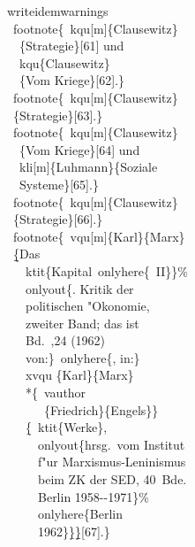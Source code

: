 \documentclass[12pt,a4paper]{article}
\newcommand{\pbs}{\string\ \unskip}
\newcommand{\bs}{\protect\pbs}
\begin{document}
\vspace{1ex}
\Doppelbox
{\bs writeidemwarnings
 \\ \ \bs footnote\{\bs kqu[m]\{Clausewitz\} 
 \\ \ \ \ \{Strategie\}[61] und 
 \\ \ \ \bs kqu\{Clausewitz\}
 \\ \ \ \ \{Vom Kriege\}[62].\} 
 \\[1ex] \ \bs footnote\{\bs kqu[m]\{Clausewitz\} 
 \\ \ \ \{Strategie\}[63].\}
 \\[1ex] \ \bs footnote\{\bs kqu[m]\{Clausewitz\} 
 \\ \ \ \ \{Vom Kriege\}[64] und 
 \\ \ \ \bs kli[m]\{Luhmann\}\{Soziale 
 \\ \ \ \ Systeme\}[65].\}
 \\[1ex] \ \bs footnote\{\bs kqu[m]\{Clausewitz\} 
 \\ \ \ \{Strategie\}[66].\}
 \\[1ex] \ \bs footnote\{\bs vqu[m]\{Karl\}\{Marx\} 
 \\ \ \ \b{\b{\{}}Das 
 \\ \ \ \ \bs ktit\{Kapital\bs onlyhere\{\string~II\}\}\%
 \\ \ \ \ \bs onlyout\{. Kritik der 
 \\ \ \ \ \ politischen "Okonomie, 
 \\ \ \ \ \ zweiter Band; das ist 
 \\ \ \ \ \ Bd.\bs,24 (1962) 
 \\ \ \ \ \ von:\}\bs onlyhere\{, in:\} 
 \\ \ \ \ \bs xvqu \{Karl\}\{Marx\}
 \\ \ \ \ \ *\{\bs vauthor
 \\ \ \ \ \ \ \ \ \{Friedrich\}\{Engels\}\} 
 \\ \ \ \ \ \b{\{}\bs ktit\{Werke\}, 
 \\ \ \ \ \ \ \bs onlyout\{hrsg.\ vom Institut 
 \\ \ \ \ \ \ \ f"ur Marxismus-Leninismus 
 \\ \ \ \ \ \ \ beim ZK der SED, 40\string~Bde. 
 \\ \ \ \ \ \ \ Berlin 1958-{}-1971\}\%
 \\ \ \ \ \ \ \bs onlyhere\{Berlin 
 \\ \ \ \ \ \ \ 1962\}\b{\}}\b{\b{\}}}[67].\}
}
\end{document}

